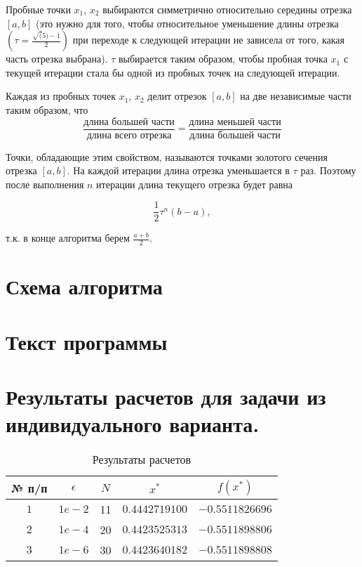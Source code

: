 Пробные точки $x_1$, $x_2$ выбираются симметрично относительно середины отрезка $[a, b]$ (это нужно для того, чтобы относительное уменьшение длины отрезка $(\tau = \frac{\sqrt(5) - 1}{2})$ при переходе к следующей итерации не зависела от того, какая часть отрезка выбрана). $\tau$ выбирается таким образом, чтобы пробная точка $x_1$ с текущей итерации стала бы одной из пробных точек на следующей итерации. 

Каждая из пробных точек $x_1$, $x_2$ делит отрезок $[a, b]$ на две независимые части таким образом, что 
\begin{equation*}
\frac{\text{длина большей части}}{\text{длина всего отрезка}} = \frac{\text{длина меньшей части}}{\text{длина большей части}}
\end{equation*}

Точки, обладающие этим свойством, называются точками золотого сечения отрезка $[a, b]$. На каждой итерации длина отрезка уменьшается в $\tau$ раз. Поэтому после выполнения $n$ итерации длина текущего отрезка будет равна 

\begin{equation*}
\frac{1}{2}\tau^n(b - a),
\end{equation*}

т.к. в конце алгоритма берем $\frac{a + b}{2}$.

\section{Схема алгоритма}


\section{Текст программы}


\section{Результаты расчетов для задачи из индивидуального варианта.}

\begin{table}[h]
    \centering
    \small
    \caption{Результаты расчетов }
    \label{tbl:cmp}

    \begin{tabular}{|c|c|c|c|c|}
        \hline
        № п/п & $\epsilon$ & $N$ & $x^*$ & $f(x^*)$ \\\hline
        $1$ & $1e-2$ & 11 & $0.4442719100$ & $-0.5511826696$ \\\hline
        $2$ & $1e-4$ & 20 & $0.4423525313$ & $-0.5511898806$ \\\hline
        $3$ & $1e-6$ & 30 & $0.4423640182$ & $-0.5511898808$ \\\hline
    \end{tabular}
\end{table}